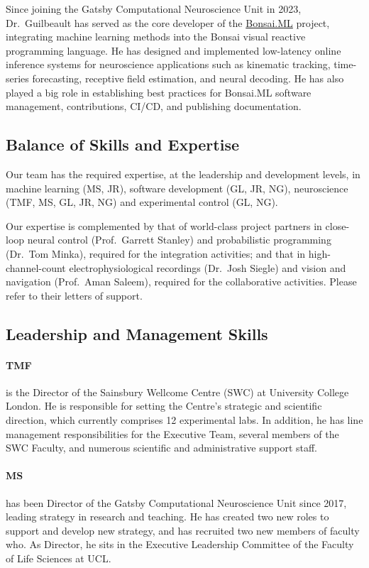 Since joining the Gatsby Computational Neuroscience Unit in 2023, Dr.~Guilbeault has served as the core developer of the \href{https://bonsai-rx.org/machinelearning}{Bonsai.ML}
project, integrating machine learning methods into the Bonsai visual reactive programming language. He has designed and implemented low-latency online inference systems for neuroscience applications such as kinematic tracking, time-series forecasting, receptive field estimation, and neural decoding. He has also played a big role in establishing best practices for Bonsai.ML software management, contributions, CI/CD, and publishing documentation.

\subsection{Balance of Skills and Expertise}

Our team has the required expertise, at the leadership and development levels,
in machine learning (MS, JR), software development (GL, JR, NG), neuroscience
(TMF, MS, GL, JR, NG) and experimental control (GL, NG).

Our expertise is complemented by that of world-class project partners in
close-loop neural control (Prof.~Garrett Stanley) and probabilistic programming
(Dr.~Tom Minka), required for the integration activities; and that in
high-channel-count electrophysiological recordings (Dr.~Josh Siegle) and vision
and navigation (Prof.~Aman Saleem), required for the collaborative activities.
Please refer to their letters of support.

\subsection{Leadership and Management Skills}

\paragraph{TMF} is the Director of the Sainsbury Wellcome Centre (SWC) at
University College London. He is responsible for setting the Centre’s strategic
and scientific direction, which currently comprises 12 experimental labs. In
addition, he has line management responsibilities for the Executive Team,
several members of the SWC Faculty, and numerous scientific and administrative
support staff.

\paragraph{MS} has been Director of the Gatsby Computational
Neuroscience Unit since 2017, leading strategy in research and teaching. He has
created two new roles to support and develop new strategy, and has recruited
two new members of faculty who.  As Director, he sits in the Executive
Leadership Committee of the Faculty of Life Sciences at UCL.

